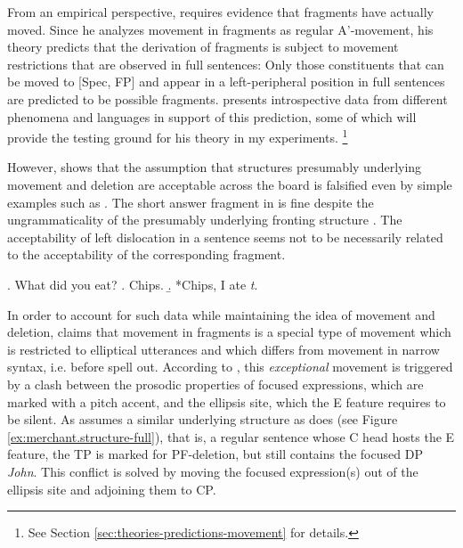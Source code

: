 From an empirical perspective, \citet{merchant2004} requires evidence that fragments have actually moved. Since he analyzes movement in fragments as regular A'-movement, his theory predicts that the derivation of fragments is subject to movement restrictions that are observed in full sentences: Only those constituents that can be moved to [Spec, FP] and appear in a left-peripheral position in full sentences are predicted to be possible fragments. \citet{merchant2004} presents introspective data from different phenomena and languages in support of this prediction, some of which will provide the testing ground for his theory in my experiments.%
%
\footnote{See Section \ref{sec:theories-predictions-movement} for details.}\afterfn%
%

However, \citet{weir2014} shows that the assumption that structures presumably underlying movement and deletion are acceptable across the board is falsified even by simple examples such as \Next. The short answer fragment in \Next[a] is fine despite the ungrammaticality of the presumably underlying fronting structure \Next[b]. The acceptability of left dislocation in a sentence seems not to be necessarily related to the acceptability of the corresponding fragment.
 
\ex. What did you eat?  \hfill \citep[168]{weir2014} \label{ex:weir-english-fronting}
\a. Chips.
\b. *Chips, I ate \textit{t}.

In order to account for such data while maintaining the idea of movement and deletion, \citet{weir2014} claims that movement in fragments is a special type of movement which is restricted to elliptical utterances and which differs from movement in narrow syntax, i.e. before spell out. According to \citeauthor{weir2014}, this \textit{exceptional} movement is triggered by a clash between the prosodic properties of focused expressions, which are marked with a pitch accent, and the ellipsis site, which the E feature requires to be silent. As \citet{weir2014} assumes a similar underlying structure as \citet{merchant2004} does (see Figure \ref{ex:merchant.structure-full}), that is, a regular sentence whose C head hosts the E feature, the TP is marked for PF-deletion, but still contains the focused DP \textit{John}. This conflict is solved by moving the focused expression(s) out of the ellipsis site and adjoining them to CP.

